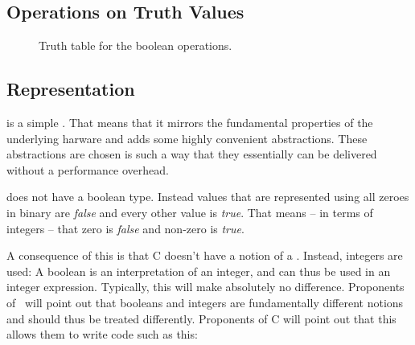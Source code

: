 \subsection{Operations on Truth Values}

\begin{figure}[tbp]
  
  \caption{Truth table for the boolean operations.}
  \label{fig:prim:bool:and}
\end{figure}


\subsection{Representation}


\csharpsubsection{\csharp}

\begin{syntaxfloat}
  
  \caption{Expressions of boolean operators}
  \label{syntax:prim:bool:ops}
\end{syntaxfloat}



 is a simple . That means that it mirrors the fundamental properties of the underlying harware and adds some highly convenient abstractions. These abstractions are chosen is such a way that they essentially can be delivered without a performance overhead.

 does not have a boolean type. Instead  values that are represented using all zeroes in binary are \textsl{false} and every other value is \textsl{true}. That means -- in terms of integers -- that zero is \textsl{false} and non-zero is \textsl{true}. %

A consequence of this is that C doesn't have a notion of a . Instead, integers are used: A boolean is an interpretation of an integer, and can thus be used in an integer expression. Typically, this will make absolutely no difference. Proponents of \csharp\ will point out that booleans and integers are fundamentally different notions and should thus be treated differently. Proponents of C will point out that this allows them to write code such as this:

